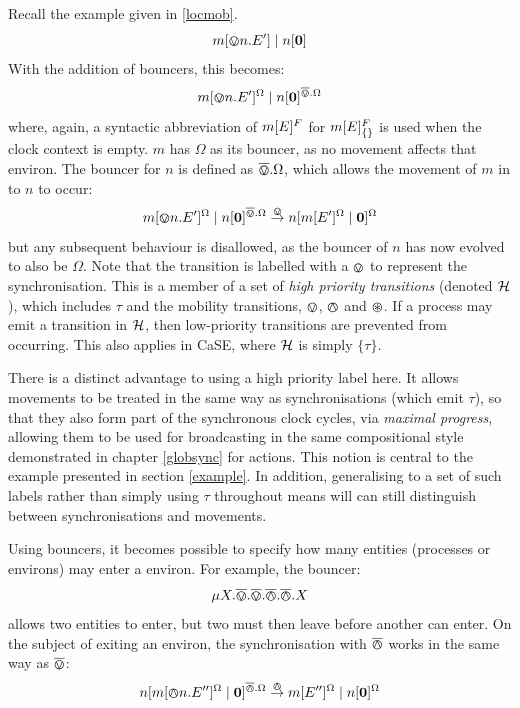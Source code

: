 Recall the example given in \ref{locmob}.
\begin{equation}
{m}[ \varovee n.E^\prime ]\;|\;{n}[ \textbf{0} ]
\end{equation}
With the addition of bouncers, this becomes:
\begin{equation}
{m}[ \varovee n.E^\prime ]^{\Omega}\;|\;{n}[ \textbf{0} ]^{\overline{\varovee}.\Omega}
\end{equation}
where, again, a syntactic abbreviation of ${m}[ E ]^{F}$ for
${m}[ E ]^{F}_{\{\}}$ is used when the clock context is empty. $m$ has
$\Omega$ as its bouncer, as no movement affects that environ.  The
bouncer for $n$ is defined as $\overline{\varovee}.\Omega$, which allows the movement
of $m$ in to $n$ to occur:
\begin{equation}
{m}[ \varovee n.E^\prime ]^{\Omega}\;|\;{n}[ \textbf{0} ]^{\overline{\varovee}.\Omega}
 \stackrel{\varovee}{\rightarrow}
{n}[ {m}[ E^\prime ]^{\Omega} \;|\; \textbf{0} ]^{\Omega}
\end{equation}
but any subsequent behaviour is disallowed, as the bouncer of $n$ has
now evolved to also be $\Omega$.  Note that the transition is labelled
with a $\varovee$ to represent the synchronisation.  This is a member of a
set of \emph{high priority transitions} (denoted $\text{$\mathcal{H}$}$), which
includes $\tau$ and the mobility transitions, $\varovee$, $\varowedge$ and
$\varoast$.  If a process may emit a transition in $\text{$\mathcal{H}$}$, then
low-priority transitions are prevented from occurring.  This also
applies in CaSE, where $\text{$\mathcal{H}$}$ is simply $\{ \tau \}$.  

There is a distinct advantage to using a high priority label here.  It
allows movements to be treated in the same way as synchronisations
(which emit $\tau$), so that they also form part of the synchronous
clock cycles, via \emph{maximal progress}, allowing them to be used for
broadcasting in the same compositional style demonstrated in chapter
\ref{globsync} for actions.  This notion is central to the example
presented in section \ref{example}.  In addition, generalising to a set
of such labels rather than simply using $\tau$ throughout means will can
still distinguish between synchronisations and movements.

Using bouncers, it becomes possible to specify how many entities
(processes or environs) may enter a environ.  For example, the
bouncer:
\begin{equation}
\mu X.\overline{\varovee}.\overline{\varovee}.\overline{\varowedge}.\overline{\varowedge}.X
\end{equation}
allows two entities to enter, but two must then leave before
another can enter.  On the subject of exiting an environ, the
synchronisation with $\overline{\varowedge}$ works in the same way as $\overline{\varovee}$:
\begin{equation}
{n}[ {m}[ \varowedge n.E^{\prime \prime} ]^{\Omega} \;|\; \textbf{0} ]^{\overline{\varowedge}.\Omega}
 \stackrel{\varowedge}{\rightarrow}
{m}[ E^{\prime \prime} ]^{\Omega} \;|\; {n}[ \textbf{0} ]^{\Omega}
\end{equation}

